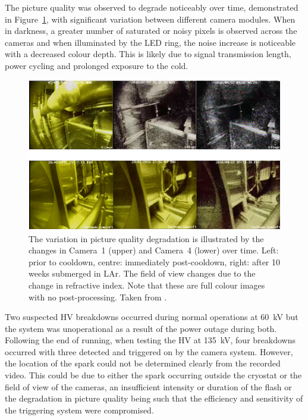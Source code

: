 The picture quality was observed to degrade noticeably over time, demonstrated in Figure~\ref{fig:35tonCamerasDegredation}, with significant variation between different camera modules.  When in darkness, a greater number of saturated or noisy pixels is observed across the cameras and when illuminated by the LED ring, the noise increase is noticeable with a decreased colour depth.  This is likely due to signal transmission length, power cycling and prolonged exposure to the cold.

\begin{figure}
  \centering
  \includegraphics[width=12cm]{35tonCamerasDegredation.pdf}
  \caption[The variation in picture quality degradation in the 35-ton camera system is illustrated by the changes in Camera~1 and Camera~4 over time.]{The variation in picture quality degradation is illustrated by the changes in Camera~1 (upper) and Camera~4 (lower) over time. Left: prior to cooldown, centre: immediately post-cooldown, right: after 10 weeks submerged in LAr.  The field of view changes due to the change in refractive index.  Note that these are full colour images with no post-processing.  Taken from \cite{35tonCameras2017}.}
  \label{fig:35tonCamerasDegredation}
\end{figure}

Two suspected HV breakdowns occurred during normal operations at 60~kV but the system was unoperational as a result of the power outage during both.  Following the end of running, when testing the HV at 135~kV, four breakdowns occurred with three detected and triggered on by the camera system.  However, the location of the spark could not be determined clearly from the recorded video. This could be due to either the spark occurring outside the cryostat or the field of view of the cameras, an insufficient intensity or duration of the flash or the degradation in picture quality being such that the efficiency and sensitivity of the triggering system were compromised.

